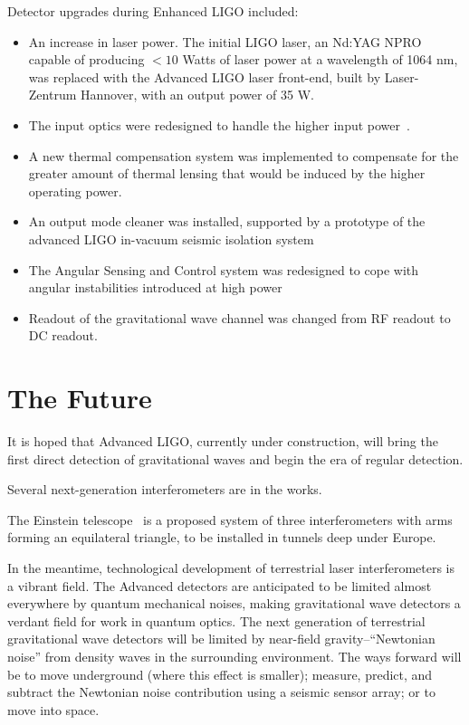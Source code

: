 Detector upgrades during Enhanced LIGO included:
\begin{itemize}
\item An increase in laser power.  The initial LIGO laser, an Nd:YAG
  NPRO capable of producing $< 10$ Watts of laser power at a
  wavelength of 1064 nm, was replaced with the Advanced LIGO laser
  front-end, built by Laser-Zentrum Hannover, with an output power of 35 W.
\item The input optics were redesigned to handle the higher input
  power~\cite{Dooley2011Characterization,Quetschke2008ElectroOptic}.  
\item A new thermal compensation system was implemented to compensate
  for the greater amount of thermal lensing that would be induced by
  the higher operating power.
\item An output mode cleaner was installed, supported by a prototype
  of the advanced LIGO in-vacuum seismic isolation system~\cite{KisselThesis}
\item The Angular Sensing and Control system was redesigned to cope
  with angular instabilities introduced at high
  power~\cite{Sidles2006Optical,DooleyAngular}
\item Readout of the gravitational wave channel was changed from RF
  readout to DC readout.
\end{itemize}

\section{The Future}

It is hoped that Advanced LIGO, currently under construction, will
bring the first direct detection of gravitational waves and begin the
era of regular detection.

Several next-generation interferometers are in the works. 

The Einstein telescope~\cite{EinsteinTelescopeDesignStudy2011} is a
proposed system of three interferometers with arms forming an
equilateral triangle, to be installed in tunnels deep under Europe.

In the meantime, technological development of terrestrial laser
interferometers is a vibrant field.  The Advanced detectors are
anticipated to be limited almost everywhere by quantum mechanical
noises, making gravitational wave detectors a verdant field for work
in quantum optics.  The next generation of terrestrial gravitational
wave detectors will be limited by near-field gravity--``Newtonian
noise'' from density waves in the surrounding environment.  The ways
forward will be to move underground (where this effect is smaller);
measure, predict, and subtract the Newtonian noise contribution using
a seismic sensor array; or to move into space.

